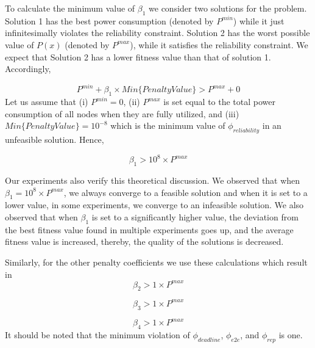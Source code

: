 To calculate the minimum value of $\beta_1$ we consider two solutions for the problem. Solution 1 has the best power consumption (denoted by $P^{min}$) while it just infinitesimally violates the reliability constraint. Solution 2 has the worst possible value of $P(x)$ (denoted by $P^{max}$), while it satisfies the reliability constraint. We expect that Solution 2 has a lower fitness value than that of solution 1. Accordingly,

\begin{equation}
\label{eq:PnelatyMem1}
P^{min} + \beta_1 \times Min\{Penalty Value\} > P^{max} + 0
\end{equation}  
Let us assume that (i) $P^{min} = 0$, (ii) $P^{max}$ is set equal to the total power consumption of all nodes when they are fully utilized, and (iii) $Min\{Penalty Value\} = 10^{-8}$ which is the minimum value of $\phi_{reliability}$ in an unfeasible solution. Hence,

\begin{equation}
\label{eq:PnelatyMem2}
\beta_1 > 10^8 \times P^{max}
\end{equation}  

Our experiments also verify this theoretical discussion. We observed that when $\beta_1 = 10^8 \times P^{max}$, we always converge to a feasible solution and when it is set to a lower value, in some experiments, we converge to an infeasible solution. We also observed that when $\beta_1$ is set to a significantly higher value, the deviation from the best fitness value found in multiple experiments goes up, and the average fitness value is increased, thereby, the quality of the solutions is decreased.

Similarly, for the other penalty coefficients we use these calculations which result in
\begin{equation}
\label{}
\beta_2 > 1 \times P^{max}  
\end{equation}

\begin{equation}
\label{}
\beta_3 > 1 \times P^{max}
\end{equation}

\begin{equation}
\label{}
\beta_4 > 1 \times P^{max}
\end{equation}
It should be noted that the minimum violation of $\phi_{deadline}$, $\phi_{e2e}$, and $\phi_{rep}$ is one.




